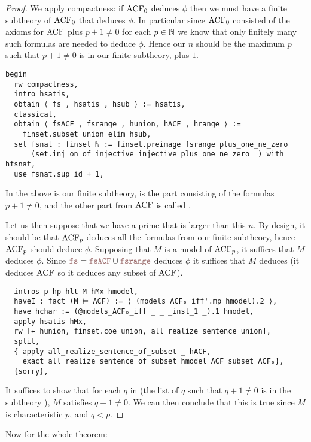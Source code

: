 \begin{proof}
We apply compactness:
if $\operatorname{ACF}_{0}$ deduces $\phi$ then we must have a finite subtheory of
$\operatorname{ACF}_{0}$ that deduces $\phi$.
In particular since $\operatorname{ACF}_{0}$ consisted of the axioms for $\operatorname{ACF}$ plus
$p + 1 \ne 0$ for each $p \in \mathbb{N}$ we know that only finitely many
such formulas are needed to deduce $\phi$.
Hence our $n$ should be the maximum $p$ such that $p + 1 \ne 0$
is in our finite subtheory, plus $1$.
\begin{lstlisting}
begin
  rw compactness,
  intro hsatis,
  obtain ⟨ fs , hsatis , hsub ⟩ := hsatis,
  classical,
  obtain ⟨ fsACF , fsrange , hunion, hACF , hrange ⟩ :=
    finset.subset_union_elim hsub,
  set fsnat : finset ℕ := finset.preimage fsrange plus_one_ne_zero
      (set.inj_on_of_injective injective_plus_one_ne_zero _) with hfsnat,
  use fsnat.sup id + 1, \end{lstlisting}

In the above  is our finite subtheory,
 is the part consisting of the formulas $p + 1 \ne 0$,
and the other part from $\operatorname{ACF}$ is called .

Let us then suppose that we have a prime that is larger than this $n$.
By design,
it should be that $\operatorname{ACF}_{p}$ deduces all the formulas from
our finite subtheory, hence $\operatorname{ACF}_{p}$ should deduce $\phi$.
Supposing that $M$ is a model of $\operatorname{ACF}_{p}$,
it suffices that $M$ deduces $\phi$.
Since $\code{fs} = \code{fsACF} \cup \code{fsrange}$
deduces $\phi$ it suffices that $M$ deduces 
(it deduces $\operatorname{ACF}$ so it deduces any subset of $\operatorname{ACF}$).

\begin{lstlisting}
  intros p hp hlt M hMx hmodel,
  haveI : fact (M ⊨ ACF) := ⟨ (models_ACFₚ_iff'.mp hmodel).2 ⟩,
  have hchar := (@models_ACFₚ_iff _ _ _inst_1 _).1 hmodel,
  apply hsatis hMx,
  rw [← hunion, finset.coe_union, all_realize_sentence_union],
  split,
  { apply all_realize_sentence_of_subset _ hACF,
    exact all_realize_sentence_of_subset hmodel ACF_subset_ACFₚ},
  {sorry}, \end{lstlisting}

It suffices to show that for each $q$ in 
(the list of $q$ such that $q + 1 \ne 0$ is in the subtheory ),
$M$ satisfies $q + 1 \ne 0$.
We can then conclude that this is true since $M$ is characteristic $p$,
and $q < p$.
\end{proof}

Now for the whole theorem:

